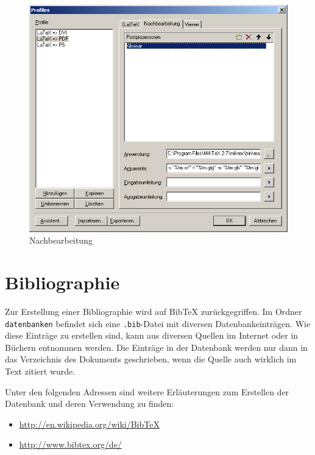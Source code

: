 \begin{figure}[H]
	\centering
		\includegraphics[scale=0.7]{bilder/profiles_glossar.png}
	\caption{Nachbearbeitung}
	\label{fig:nachbearbeitung}
\end{figure}


\section{Bibliographie}
\label{sec:anleitungen_bibliographie}

Zur Erstellung einer Bibliographie wird auf \gls{BibTeX} zurückgegriffen. Im Ordner \texttt{datenbanken} befindet sich eine \texttt{.bib}-Datei mit diversen Datenbankeinträgen. Wie diese Einträge zu erstellen sind, kann aus diversen Quellen im Internet oder in Büchern entnommen werden. Die Einträge in der Datenbank werden nur dann in das Verzeichnis des Dokuments geschrieben, wenn die Quelle auch wirklich im Text zitiert wurde.

Unter den folgenden Adressen sind weitere Erläuterungen zum Erstellen der Datenbank und deren Verwendung zu finden:
\begin{itemize}
	\item \url{http://en.wikipedia.org/wiki/BibTeX}
	\item \url{http://www.bibtex.org/de/}
\end{itemize}